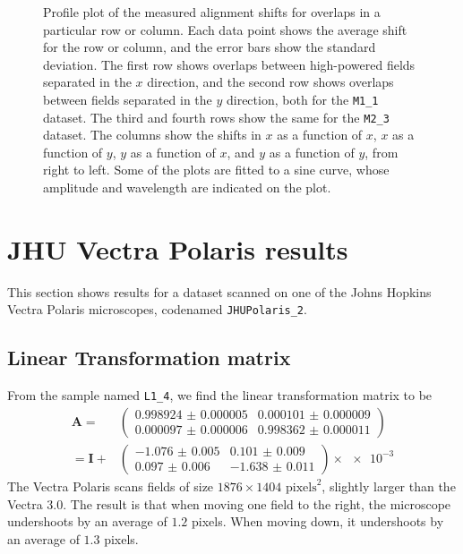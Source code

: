 \documentclass{article}
\newcommand{\matrixbold}[1]{\mathbf{#1}}
\newcommand{\M}[2]{\texttt{M#1\_#2}}
\begin{document}
\begin{figure}[ht]
\begin{subfigure}{0.24\linewidth}
		\caption{}
		\label{fig:sinewave4yy2}
	\end{subfigure}
	\caption{Profile plot of the measured alignment shifts for overlaps in a particular row or column.  Each data point shows the average shift for the row or column, and the error bars show the standard deviation.  The first row shows overlaps between high-powered fields separated in the $x$ direction, and the second row shows overlaps between fields separated in the $y$ direction, both for the \M11 dataset.  The third and fourth rows show the same for the \M23 dataset.  The columns show the shifts in $x$ as a function of $x$, $x$ as a function of $y$, $y$ as a function of $x$, and $y$ as a function of $y$, from right to left.  Some of the plots are fitted to a sine curve, whose amplitude and wavelength are indicated on the plot.}
	\label{fig:sinewaves}
\end{figure}

\clearpage

\section{JHU Vectra Polaris results}

This section shows results for a dataset scanned on one of the Johns Hopkins Vectra Polaris microscopes, codenamed \texttt{JHUPolaris\_2}.

\subsection{Linear Transformation matrix}

From the sample named \texttt{L1\_4}, we find the linear transformation matrix to be
\begin{align}
\matrixbold{A}=&\begin{pmatrix}
\num{0.998924(5)} &
\num{0.000101(9)} \\
\num{0.000097(6)} &
\num{0.998362(11)}
\end{pmatrix} \\
=\matrixbold{I} + &\begin{pmatrix}
\num{-1.076(5)} &
\num{0.101(9)} \\
\num{0.097(6)} &
\num{-1.638(11)}
\end{pmatrix} \times \num{e-3}
\label{eq:Amatrix_L1_4}
\end{align}
The Vectra Polaris scans fields of size $1876\times1404$ $\text{pixels}^2$, slightly larger than the Vectra 3.0.  The result is that when moving one field to the right, the microscope undershoots by an average of $1.2$ pixels.  When moving down, it undershoots by an average of $1.3$ pixels.
\end{document}
